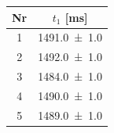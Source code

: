 \begin{tabular}{cc}
\hline
Nr & $t_{1}$ [\unit{ms}] \\
\hline
1 & \num{1491.0 \pm 1.0} \\
2 & \num{1492.0 \pm 1.0} \\
3 & \num{1484.0 \pm 1.0} \\
4 & \num{1490.0 \pm 1.0} \\
5 & \num{1489.0 \pm 1.0} \\
\hline
\end{tabular}
